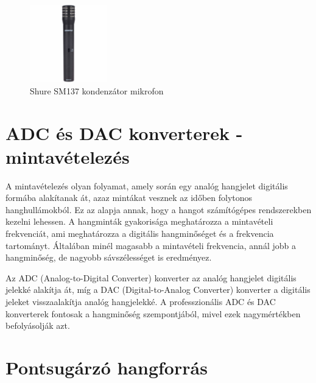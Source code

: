 \begin{figure}[H]
    \centering
    \includegraphics[width=0.3\textwidth]{figures/shure-sm137.jpg}
    \caption{Shure SM137 kondenzátor mikrofon}
    \label{fig:shure_sm137}
\end{figure}
 
\section{ADC és DAC konverterek - mintavételezés}

A mintavételezés olyan folyamat, amely során egy analóg hangjelet digitális formába alakítanak át, azaz mintákat vesznek az időben folytonos hanghullámokból. 
Ez az alapja annak, hogy a hangot számítógépes rendszerekben kezelni lehessen. A hangminták gyakorisága meghatározza a mintavételi frekvenciát, 
ami meghatározza a digitális hangminőséget és a frekvencia tartományt. Általában minél magasabb a mintavételi frekvencia, annál jobb a hangminőség, 
de nagyobb sávszélességet is eredményez. 

Az ADC (Analog-to-Digital Converter) konverter az analóg hangjelet digitális jelekké alakítja át, míg a DAC (Digital-to-Analog Converter) 
konverter a digitális jeleket visszaalakítja analóg hangjelekké. 
A professzionális ADC és DAC konverterek fontosak a hangminőség szempontjából, mivel ezek nagymértékben befolyásolják azt.

\section{Pontsugárzó hangforrás}

